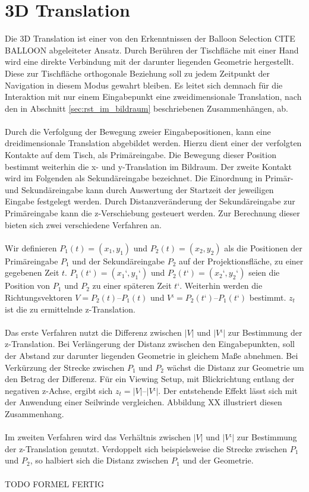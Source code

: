 \section{3D Translation}
\label{sec:3d_translation}

Die 3D Translation ist einer von den Erkenntnissen der Balloon Selection CITE BALLOON abgeleiteter Ansatz. Durch Berühren  der Tischfläche mit einer Hand wird eine direkte Verbindung mit der darunter liegenden Geometrie hergestellt. Diese zur Tischfläche orthogonale Beziehung soll zu jedem Zeitpunkt der Navigation in diesem Modus gewahrt bleiben. Es leitet sich demnach für die Interaktion mit nur einem Eingabepunkt eine zweidimensionale Translation, nach den in Abschnitt \ref{sec:rst_im_bildraum} beschriebenen Zusammenhängen, ab.
\\\\
Durch die Verfolgung der Bewegung zweier Eingabepositionen, kann eine dreidimensionale Translation abgebildet werden. Hierzu dient einer der verfolgten Kontakte auf dem Tisch, als Primäreingabe. Die Bewegung dieser Position bestimmt weiterhin die x- und y-Translation im Bildraum. Der zweite Kontakt wird im Folgenden als Sekundäreingabe bezeichnet. Die Einordnung in Primär- und Sekundäreingabe kann durch Auswertung der Startzeit der jeweiligen Eingabe festgelegt werden. Durch Distanzveränderung der Sekundäreingabe zur Primäreingabe kann die z-Verschiebung gesteuert werden. Zur Berechnung dieser bieten sich zwei verschiedene Verfahren an.
\\\\
Wir definieren $P_1(t) = (x_1, y_1)$ und $P_2(t) = (x_2, y_2)$ als die Positionen der Primäreingabe $P_1$ und der Sekundäreingabe $P_2$ auf der Projektionsfläche, zu einer gegebenen Zeit $t$. $P_1(t‘) = (x_1‘, y_1‘)$ und $P_2(t‘) = (x_2‘, y_2‘)$  seien die Position von $P_1$ und $P_2$ zu einer späteren Zeit $t‘$. Weiterhin werden die Richtungsvektoren $V = P_2(t) – P_1(t)$ und $V‘ = P_2(t‘) – P_1(t‘)$ bestimmt. $z_t$ ist die zu ermittelnde z-Translation.
\\\\
Das erste Verfahren nutzt die Differenz zwischen $|V|$ und $|V‘|$ zur Bestimmung der z-Translation. Bei Verlängerung der Distanz zwischen den Eingabepunkten, soll der Abstand zur darunter liegenden Geometrie in gleichem Maße abnehmen. Bei Verkürzung der Strecke zwischen $P_1$ und $P_2$ wächst die Distanz zur Geometrie um den Betrag der Differenz. Für ein Viewing Setup, mit Blickrichtung entlang der negativen z-Achse, ergibt sich $z_t = |V| – |V‘|$. Der entstehende Effekt lässt sich mit der Anwendung einer Seilwinde vergleichen. Abbildung XX illustriert diesen Zusammenhang.
\\\\
Im zweiten Verfahren wird das Verhältnis zwischen $|V|$ und $|V‘|$ zur Bestimmung der z-Translation genutzt. Verdoppelt sich beispielsweise die Strecke zwischen $P_1$ und $P_2$, so halbiert sich die Distanz zwischen $P_1$ und der Geometrie. 
\\\\
TODO FORMEL FERTIG
\\\\


